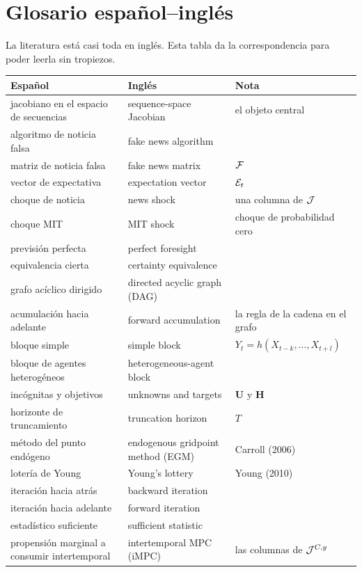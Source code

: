 \chapter{Glosario español--inglés}
\label{ap:glosario}

La literatura está casi toda en inglés. Esta tabla da la correspondencia para
poder leerla sin tropiezos.

\begin{center}\small
\begin{tabular}{@{}p{}p{}p{}@{}}
\toprule
\textbf{Español} & \textbf{Inglés} & \textbf{Nota}\\
\midrule
jacobiano en el espacio de secuencias & sequence-space Jacobian & el objeto central\\
algoritmo de noticia falsa & fake news algorithm & \\
matriz de noticia falsa & fake news matrix & $\mathcal{F}$\\
vector de expectativa & expectation vector & $\mathcal{E}_t$\\
choque de noticia & news shock & una columna de $\mathcal{J}$\\
choque MIT & MIT shock & choque de probabilidad cero\\
previsión perfecta & perfect foresight & \\
equivalencia cierta & certainty equivalence & \\
grafo acíclico dirigido & directed acyclic graph (DAG) & \\
acumulación hacia adelante & forward accumulation & la regla de la cadena en el grafo\\
bloque simple & simple block & $Y_t=h(X_{t-k},\dots,X_{t+l})$\\
bloque de agentes heterogéneos & heterogeneous-agent block & \\
incógnitas y objetivos & unknowns and targets & $\mathbf{U}$ y $\mathbf{H}$\\
horizonte de truncamiento & truncation horizon & $T$\\
método del punto endógeno & endogenous gridpoint method (EGM) & Carroll (2006)\\
lotería de Young & Young's lottery & Young (2010)\\
iteración hacia atrás & backward iteration & \\
iteración hacia adelante & forward iteration & \\
estadístico suficiente & sufficient statistic & \\
propensión marginal a consumir intertemporal & intertemporal MPC (iMPC) & las columnas de $\mathcal{J}^{C,y}$\\

\end{tabular}
\end{center}
